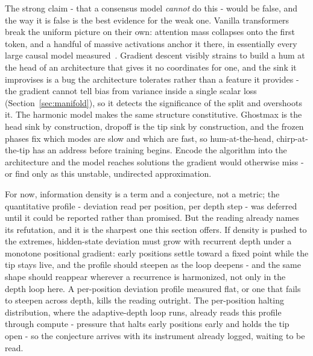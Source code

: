 The strong claim - that a consensus model \textit{cannot} do this - would be false, and the way it is false is the best evidence for the weak one. Vanilla transformers break the uniform picture on their own: attention mass collapses onto the first token, and a handful of massive activations anchor it there, in essentially every large causal model measured~\cite{xiao2024streamingllm,sun2024massive}. Gradient descent visibly strains to build a hum at the head of an architecture that gives it no coordinates for one, and the sink it improvises is a bug the architecture tolerates rather than a feature it provides - the gradient cannot tell bias from variance inside a single scalar loss (Section~\ref{sec:manifold}), so it detects the significance of the split and overshoots it. The harmonic model makes the same structure constitutive. Ghostmax is the head sink by construction, dropoff is the tip sink by construction, and the frozen phases fix which modes are slow and which are fast, so hum-at-the-head, chirp-at-the-tip has an address before training begins. Encode the algorithm into the architecture and the model reaches solutions the gradient would otherwise miss - or find only as this unstable, undirected approximation.

For now, information density is a term and a conjecture, not a metric; the quantitative profile - deviation read per position, per depth step - was deferred until it could be reported rather than promised.\paperDepthTiltSlope{} But the reading already names its refutation, and it is the sharpest one this section offers. If density is pushed to the extremes, hidden-state deviation must grow with recurrent depth under a monotone positional gradient: early positions settle toward a fixed point while the tip stays live, and the profile should steepen as the loop deepens - and the same shape should reappear wherever a recurrence is harmonized, not only in the depth loop here. A per-position deviation profile measured flat, or one that fails to steepen across depth, kills the reading outright. The per-position halting distribution, where the adaptive-depth loop runs, already reads this profile through compute - pressure that halts early positions early and holds the tip open - so the conjecture arrives with its instrument already logged, waiting to be read.

